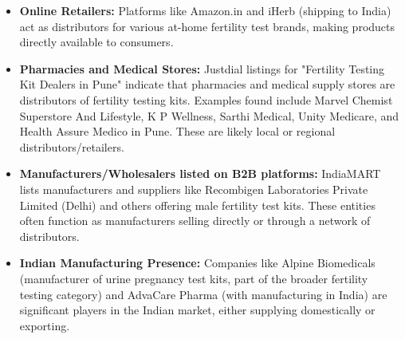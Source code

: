 \documentclass{article}
\begin{document}
\begin{itemize}
    \item \textbf{Online Retailers:} Platforms like Amazon.in and iHerb (shipping to India) act as distributors for various at-home fertility test brands, making products directly available to consumers.
    \item \textbf{Pharmacies and Medical Stores:} Justdial listings for "Fertility Testing Kit Dealers in Pune" indicate that pharmacies and medical supply stores are distributors of fertility testing kits. Examples found include Marvel Chemist Superstore And Lifestyle, K P Wellness, Sarthi Medical, Unity Medicare, and Health Assure Medico in Pune. These are likely local or regional distributors/retailers.
    \item \textbf{Manufacturers/Wholesalers listed on B2B platforms:} IndiaMART lists manufacturers and suppliers like Recombigen Laboratories Private Limited (Delhi) and others offering male fertility test kits. These entities often function as manufacturers selling directly or through a network of distributors.
    \item \textbf{Indian Manufacturing Presence:} Companies like Alpine Biomedicals (manufacturer of urine pregnancy test kits, part of the broader fertility testing category) and AdvaCare Pharma (with manufacturing in India) are significant players in the Indian market, either supplying domestically or exporting.
\end{itemize}
\end{document}
